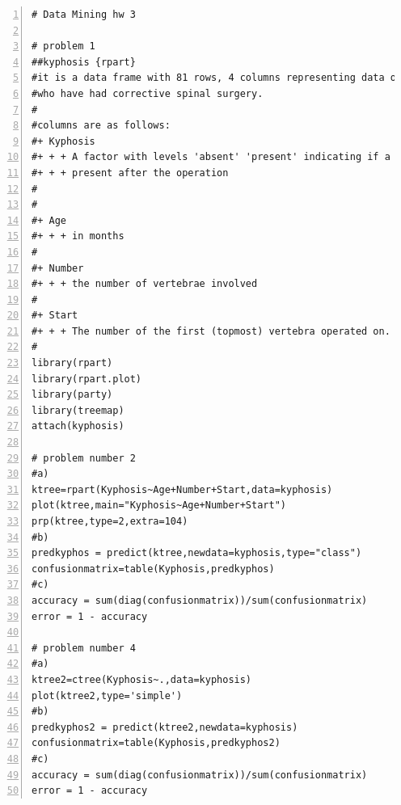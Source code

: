 \documentclass[11pt]{article}
\begin{document}
\begin{Verbatim}[numbers=left]
# Data Mining hw 3

# problem 1
##kyphosis {rpart}
#it is a data frame with 81 rows, 4 columns representing data on children 
#who have had corrective spinal surgery.
#
#columns are as follows:
#+ Kyphosis
#+ + + A factor with levels 'absent' 'present' indicating if a kyphosis was 
#+ + + present after the operation
#
#
#+ Age
#+ + + in months
#
#+ Number 
#+ + + the number of vertebrae involved
#
#+ Start
#+ + + The number of the first (topmost) vertebra operated on.
#
library(rpart)
library(rpart.plot)
library(party)
library(treemap)
attach(kyphosis)

# problem number 2
#a)
ktree=rpart(Kyphosis~Age+Number+Start,data=kyphosis)
plot(ktree,main="Kyphosis~Age+Number+Start")
prp(ktree,type=2,extra=104)
#b)
predkyphos = predict(ktree,newdata=kyphosis,type="class")
confusionmatrix=table(Kyphosis,predkyphos)
#c)
accuracy = sum(diag(confusionmatrix))/sum(confusionmatrix)
error = 1 - accuracy

# problem number 4
#a)
ktree2=ctree(Kyphosis~.,data=kyphosis)
plot(ktree2,type='simple')
#b)
predkyphos2 = predict(ktree2,newdata=kyphosis)
confusionmatrix=table(Kyphosis,predkyphos2)
#c)
accuracy = sum(diag(confusionmatrix))/sum(confusionmatrix)
error = 1 - accuracy
\end{Verbatim}
\end{document}
